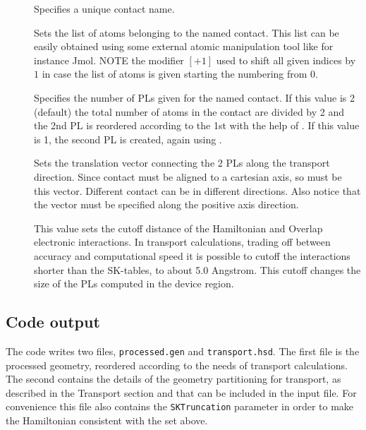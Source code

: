 \begin{description}
\item[] Specifies a unique contact name.
\item[] Sets the list of atoms belonging to the named contact. This list can
	be easily obtained using some external atomic manipulation tool like for instance Jmol. 
	NOTE the modifier $[+1]$ used to shift all given indices by $1$ in case the list of atoms 
	is given starting the numbering from $0$.
\item[] Specifies the number of PLs given for the named contact. If this value 
	is 2 (default) the total number of atoms in the contact are divided by 2 and the 2nd PL
	is reordered according to the 1st with the help of . If this value is 1, 
	the second PL is created, again using . 
\item[] Sets the translation vector connecting the 2 PLs along the transport direction. 
	Since contact must be aligned to a cartesian axis, so must be this vector. Different contact
      can be in different directions. Also notice that the vector must be specified along the positive axis 
      direction.
\item[]  This value sets the cutoff distance of the Hamiltonian and Overlap electronic
     interactions. In transport calculations, trading off between accuracy and computational speed
     it is possible to cutoff the interactions shorter than the SK-tables, to about 5.0 Angstrom. 
     This cutoff changes the size of the PLs computed in the device region.	
\end{description}

\subsection{Code output}

The code writes two files, \verb|processed.gen| and \verb|transport.hsd|. The first file is the 
processed geometry, reordered according to the needs of transport calculations. The second 
contains the details of the geometry partitioning for transport, as described in the Transport 
section and that can be included in the input file.
For convenience this file also contains the \verb|SKTruncation| parameter in order to 
make the Hamiltonian consistent with the  set above. 


